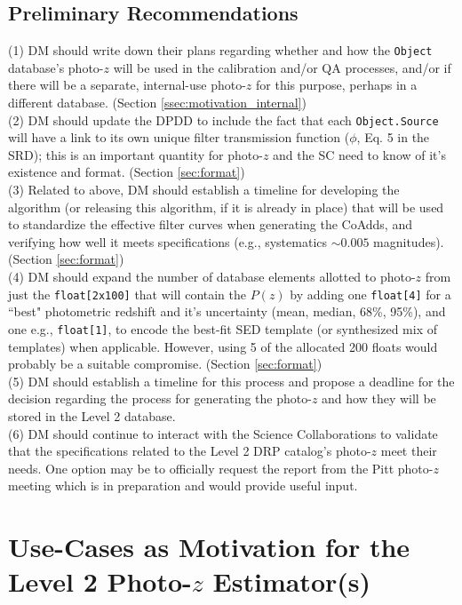 \documentclass[DM,lsstdraft,toc]{lsstdoc}
\begin{document}
\subsection{Preliminary Recommendations}\label{ssec:intro_pr}

\noindent (1) DM should write down their plans regarding whether and how the {\tt Object} database's photo-$z$ will be used in the calibration and/or QA processes, and/or if there will be a separate, internal-use photo-$z$ for this purpose, perhaps in a different database. (Section \ref{ssec:motivation_internal}) \\
(2) DM should update the DPDD to include the fact that each {\tt Object.Source} will have a link to its own unique filter transmission function ($\phi$, Eq. 5 in the SRD); this is an important quantity for photo-$z$ and the SC need to know of it's existence and format. (Section \ref{sec:format}) \\
(3) Related to above, DM should establish a timeline for developing the algorithm (or releasing this algorithm, if it is already in place) that will be used to standardize the effective filter curves when generating the CoAdds, and verifying how well it meets specifications (e.g., systematics $\sim 0.005$ magnitudes). (Section \ref{sec:format})\\
(4) DM should expand the number of database elements allotted to photo-$z$ from just the {\tt float[2x100]} that will contain the $P(z)$ by adding one {\tt float[4]} for a ``best" photometric redshift and it's uncertainty (mean, median, 68\%, 95\%), and one e.g., {\tt float[1]}, to encode the best-fit SED template (or synthesized mix of templates) when applicable. However, using 5 of the allocated 200 floats would probably be a suitable compromise. (Section \ref{sec:format}) \\
(5) DM should establish a timeline for this process and propose a deadline for the decision regarding the process for generating the photo-$z$ and how they will be stored in the Level 2 database. \\
(6) DM should continue to interact with the Science Collaborations to validate that the specifications related to the Level 2 DRP catalog's photo-$z$ meet their needs. One option may be to officially request the report from the Pitt photo-$z$ meeting which is in preparation and would provide useful input.


\section{Use-Cases as Motivation for the Level 2 Photo-$z$ Estimator(s)}\label{sec:motivation}
\end{document}
